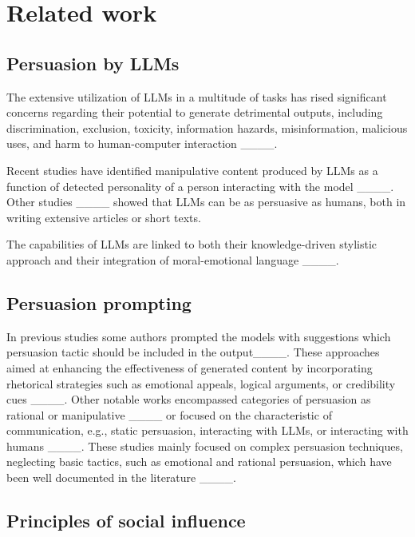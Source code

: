\section{Related work}
\subsection{Persuasion by LLMs}

The extensive utilization of LLMs in a multitude of tasks has rised significant concerns regarding their potential to generate detrimental outputs, including discrimination, exclusion, toxicity, information hazards, misinformation, malicious uses, and harm to human-computer interaction ____. 

Recent studies have identified manipulative content produced by LLMs as a function of detected personality of a person interacting with the model ____. Other studies ____ showed that LLMs can be as persuasive as humans, both in writing extensive articles or short texts. 

The capabilities of LLMs are linked to both their knowledge-driven stylistic approach and their integration of moral-emotional language ____.

\subsection{{Persuasion prompting}}

In previous studies some authors prompted the models with suggestions which persuasion tactic should be included in the output____.  These approaches aimed at enhancing the effectiveness of generated content by incorporating rhetorical strategies such as emotional appeals, logical arguments, or credibility cues ____.
Other notable works encompassed categories of persuasion as rational or manipulative ____ or focused on the characteristic of communication, e.g., static persuasion, interacting with LLMs, or interacting with humans ____.  
These studies mainly focused on complex persuasion techniques, neglecting basic tactics, such as emotional and rational persuasion, which have been well documented in the literature ____. 

\subsection{Principles of social influence}

